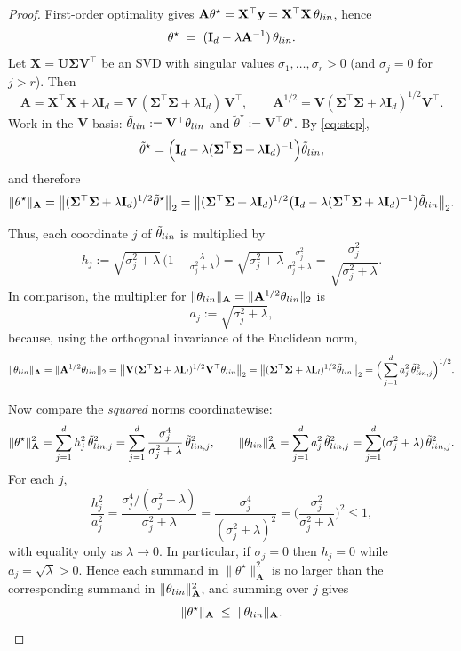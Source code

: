 \documentclass[10pt,a4paper]{amsart}
\def\amat{\mathbf{A}}
\def\imat{\mathbf{I}}
\def\xmat{\mathbf{X}}
\def\yvec{\mathbf{y}}
\begin{document}
\begin{proof}
First-order optimality gives $\amat\theta^\star=\xmat^\top\yvec=\xmat^\top\xmat\,\theta_{\rm lin}$, hence
\begin{equation}\label{eq:step}
\theta^\star \;=\; (\imat_d - \lambda\amat^{-1})\,\theta_{\rm lin}.
\end{equation}
Let $\xmat=\mathbf{U}\mathbf{\Sigma}\mathbf{V}^\top$ be an SVD with singular values $\sigma_1,\dots,\sigma_r>0$ (and $\sigma_j=0$ for $j>r$).
Then
\[
\amat=\xmat^\top\xmat+\lambda\imat_d
= \mathbf{V}\,(\mathbf{\Sigma}^\top\mathbf{\Sigma}+\lambda\imat_d)\,\mathbf{V}^\top,
\qquad
\amat^{1/2}=\mathbf{V}(\mathbf{\Sigma}^\top\mathbf{\Sigma}+\lambda\imat_d)^{1/2}\mathbf{V}^\top.
\]
Work in the $\mathbf{V}$-basis: $\tilde\theta_{\rm lin}:=\mathbf{V}^\top\theta_{\rm lin}$ and $\tilde\theta^\star:=\mathbf{V}^\top\theta^\star$.
By \eqref{eq:step},
\[
\tilde\theta^\star
= \Big(\imat_d-\lambda(\mathbf{\Sigma}^\top\mathbf{\Sigma}+\lambda\imat_d)^{-1}\Big)\tilde\theta_{\rm lin},
\]
and therefore
\[
\|\theta^\star\|_{\amat}
= \big\|(\mathbf{\Sigma}^\top\mathbf{\Sigma}+\lambda\imat_d)^{1/2}\tilde\theta^\star\big\|_2
= \big\|(\mathbf{\Sigma}^\top\mathbf{\Sigma}+\lambda\imat_d)^{1/2}
\big(\imat_d-\lambda(\mathbf{\Sigma}^\top\mathbf{\Sigma}+\lambda\imat_d)^{-1}\big)\tilde\theta_{\rm lin}\big\|_2.
\]

Thus, each coordinate $j$ of $\tilde\theta_{\rm lin}$ is multiplied by
\[
h_j
:= \sqrt{\sigma_j^2+\lambda}\,\Big(1-\tfrac{\lambda}{\sigma_j^2+\lambda}\Big)
= \sqrt{\sigma_j^2+\lambda}\,\tfrac{\sigma_j^2}{\sigma_j^2+\lambda}
= \frac{\sigma_j^2}{\sqrt{\sigma_j^2+\lambda}}.
\]
In comparison, the multiplier for $\|\theta_{\rm lin}\|_{\amat}
=\|\amat^{1/2}\theta_{\rm lin}\|_2$ is
\[
a_j:=\sqrt{\sigma_j^2+\lambda},
\]
because, using the orthogonal invariance of the Euclidean norm,
\[
\|\theta_{\rm lin}\|_{\amat}
=\|\amat^{1/2}\theta_{\rm lin}\|_2
=\big\|\mathbf{V}(\mathbf{\Sigma}^\top\mathbf{\Sigma}+\lambda\imat_d)^{1/2}\mathbf{V}^\top\theta_{\rm lin}\big\|_2
=\big\|(\mathbf{\Sigma}^\top\mathbf{\Sigma}+\lambda\imat_d)^{1/2}\tilde\theta_{\rm lin}\big\|_2
=\Big(\sum_{j=1}^d a_j^2\,\tilde\theta_{{\rm lin},j}^2\Big)^{1/2}.
\]

Now compare the \emph{squared} norms coordinatewise:
\[
\|\theta^\star\|_{\amat}^2
= \sum_{j=1}^d h_j^2\,\tilde\theta_{{\rm lin},j}^2
= \sum_{j=1}^d \frac{\sigma_j^4}{\sigma_j^2+\lambda}\,\tilde\theta_{{\rm lin},j}^2,
\qquad
\|\theta_{\rm lin}\|_{\amat}^2
= \sum_{j=1}^d a_j^2\,\tilde\theta_{{\rm lin},j}^2
= \sum_{j=1}^d (\sigma_j^2+\lambda)\,\tilde\theta_{{\rm lin},j}^2.
\]
For each $j$,
\[
\frac{h_j^2}{a_j^2}
= \frac{\sigma_j^4/(\sigma_j^2+\lambda)}{\sigma_j^2+\lambda}
= \frac{\sigma_j^4}{(\sigma_j^2+\lambda)^2}
= \Big(\frac{\sigma_j^2}{\sigma_j^2+\lambda}\Big)^2 \le 1,
\]
with equality only as $\lambda\to 0$. In particular, if $\sigma_j=0$ then $h_j=0$ while $a_j=\sqrt{\lambda}>0$.
Hence each summand in $\|\theta^\star\|_{\amat}^2$ is no larger than the corresponding summand in
$\|\theta_{\rm lin}\|_{\amat}^2$, and summing over $j$ gives
\[
\|\theta^\star\|_{\amat}\;\le\;\|\theta_{\rm lin}\|_{\amat}.
\]

\end{proof}
\end{document}
